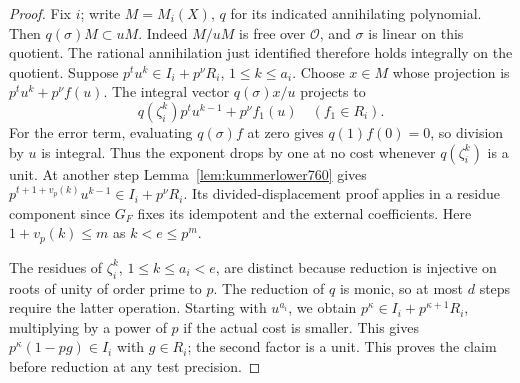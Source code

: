 \documentclass[a4paper,11pt]{article}
\theoremstyle{definition}
\theoremstyle{remark}
\numberwithin{equation}{section}
\begin{document}
\begin{proof}
Fix \(i\); write \(M=M_i(X)\), \(q\) for its indicated
annihilating polynomial. Then \(q(\sigma)M\subset uM\).
Indeed \(M/uM\) is free over \(\mathcal O\), and
\(\sigma\) is linear on this quotient. The rational
annihilation just identified therefore holds integrally
on the quotient. Suppose \(p^t u^k\in I_i+p^\nu R_i\),
\(1\le k\le a_i\). Choose \(x\in M\) whose projection is
\(p^t u^k+p^\nu f(u)\). The integral vector \(q(\sigma)x/u\)
projects to
\[
                 q(\zeta_i^k)p^t u^{k-1}+p^\nu f_1(u)
                    \quad(f_1\in R_i).
\]
For the error term, evaluating \(q(\sigma)f\) at zero
gives \(q(1)f(0)=0\), so division by \(u\) is integral.
Thus the exponent drops by one at no cost whenever
\(q(\zeta_i^k)\) is a unit. At another step
Lemma~\ref{lem:kummerlower760} gives
\(p^{t+1+v_p(k)}u^{k-1}\in I_i+p^\nu R_i\).
Its divided-displacement proof applies in a residue
component since \(G_F\) fixes its idempotent and the
external coefficients. Here \(1+v_p(k)\le m\) as
\(k<e\le p^m\).

The residues of \(\zeta_i^k\), \(1\le k\le a_i<e\),
are distinct because reduction is injective on roots
of unity of order prime to \(p\). The reduction of \(q\)
is monic, so at most \(d\) steps require the latter
operation. Starting with \(u^{a_i}\), we obtain
\(p^\kappa\in I_i+p^{\kappa+1}R_i\), multiplying by a
power of \(p\) if the actual cost is smaller. This gives
\(p^\kappa(1-pg)\in I_i\) with \(g\in R_i\); the second
factor is a unit. This proves the claim before reduction
at any test precision.
\end{proof}
\end{document}
